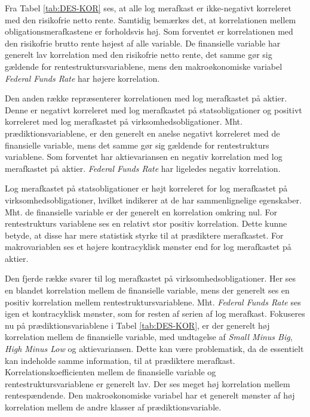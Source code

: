\documentclass[
  a4paper,
  oneside]{memoir}
\begin{document}
Fra Tabel \ref{tab:DES-KOR} ses, at alle log merafkast er ikke-negativt korreleret med den risikofrie netto rente. Samtidig bemærkes det, at korrelationen mellem obligationsmerafkastene er forholdsvis høj. Som forventet er korrelationen med den risikofrie brutto rente højest af alle variable. De finansielle variable har generelt lav korrelation med den risikofrie netto rente, det samme gør sig gældende for rentestruktursvariablene, mens den makroøkonomiske variabel \emph{Federal Funds Rate} har højere korrelation.

Den anden række repræsenterer korrelationen med log merafkastet på aktier. Denne er negativt korreleret med log merafkastet på statsobligationer og positivt korreleret med log merafkastet på virksomhedsobligationer. Mht. prædiktionsvariablene, er den generelt en anelse negativt korreleret med de finansielle variable, mens det samme gør sig gældende for rentestrukturs variablene. Som forventet har aktievariansen en negativ korrelation med log merafkastet på aktier. \emph{Federal Funds Rate} har ligeledes negativ korrelation.

Log merafkastet på statsobligationer er højt korreleret for log merafkastet på virksomhedsobligationer, hvilket indikerer at de har sammenlignelige egenskaber. Mht. de finansielle variable er der generelt en korrelation omkring nul. For rentestrukturs variablene ses en relativt stor positiv korrelation. Dette kunne betyde, at disse har mere statistisk styrke til at prædiktere merafkastet. For makrovariablen ses et højere kontracyklisk mønster end for log merafkastet på aktier.

Den fjerde række svarer til log merafkastet på virksomhedsobligationer. Her ses en blandet korrelation mellem de finansielle variable, mens der generelt ses en positiv korrelation mellem rentestruktursvariablene. Mht. \emph{Federal Funds Rate} ses igen et kontracyklisk mønster, som for resten af serien af log merafkast. Fokuseres nu på prædiktionsvariablene i Tabel \ref{tab:DES-KOR}, er der generelt høj korrelation mellem de finansielle variable, med undtagelse af \emph{Small Minus Big}, \emph{High Minus Low} og aktievariansen. Dette kan være problematisk, da de essentielt kan indeholde samme information, til at prædiktere merafkast. Korrelationskoefficienten mellem de finansielle variable og rentestruktursvariablene er generelt lav. Der ses meget høj korrelation mellem rentespændende. Den makroøkonomiske variabel har et generelt mønster af høj korrelation mellem de andre klasser af prædiktionsvariable.
\end{document}
